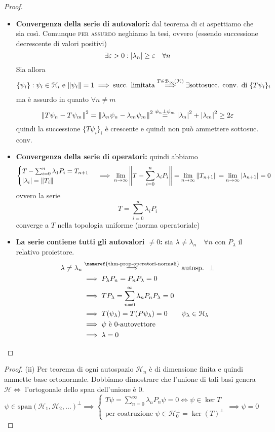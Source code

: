 \documentclass[a4paper,10pt]{article}
\theoremstyle{definition}
\newcommand{\hil}{\mathcal{H}} %
\newcommand{\noun}[1]{\textsc{#1}}
\theoremstyle{indentdefinition}
\theoremstyle{indenttheorem}
\theoremstyle{myremark}
\theoremstyle{indentgeneral}
\begin{document}
\begin{proof}
\begin{itemize}
    \item \textbf{Convergenza della serie di autovalori:} dal teorema di  ci aspettiamo che sia così. Comunque \noun{per assurdo} neghiamo la tesi, ovvero (essendo successione decrescente di valori positivi) 
    $$\exists\varepsilon>0:\abs{\lambda_n}\ge \varepsilon\quad 
    \forall n$$
    Sia allora
    \begin{align*}
        \{\psi_i\}: \psi_i\in\hil_i \text{ e } \norm{\psi_i}=1\implies \text{succ. limitata}\overset{T\in\mathcal{B}_\infty(\hil)}{\implies}\exists \text{sottosucc. conv. di } \{T\psi_i\}_i
    \end{align*}
    ma è assurdo in quanto $\forall n\ne m$
    $$\norm{T\psi_n-T\psi_m}^2=\norm{\lambda_n\psi_n-\lambda_m\psi_m}^2\overset{\psi_n\perp\psi_m}{=}\abs{\lambda_n}^2+\abs{\lambda_m}^2\ge 2\varepsilon$$
    quindi la successione $\{T\psi_i\}_i$ è crescente e quindi non può ammettere sottosuc. conv. \lightning
    \item \textbf{Convergenza della serie di operatori:} quindi abbiamo
    $$\begin{cases}
        T-\sum_{i=0}^n\lambda_1P_i=T_{n+1}\\
        \abs{\lambda_i}=\norm{T_i}
    \end{cases}\implies\lim_{n\to\infty}\norm{T-\sum_{i=0}^n\lambda_iP_i}=\lim_{n\to\infty}\norm{T_{n+1}}=\lim_{n\to\infty}\abs{\lambda_{n+1}}=0$$
    ovvero la serie
    $$T=\sum_{i=0}^\infty\lambda_iP_i$$
    converge a $T$ nella topologia uniforme (norma operatoriale)
    \item \textbf{La serie contiene tutti gli autovalori $\ne0$:} sia $\lambda\ne\lambda_n \quad \forall n$ con $P_\lambda$ il relativo proiettore.
\begin{align*}
\lambda\ne\lambda_n &\overset{\text{\nameref{thm-prop-operatori-normali}}}{\implies} \text{autosp. }\perp \\
&\implies P_\lambda P_n=P_nP_\lambda=0 \\
&\implies TP_\lambda=\sum_{n=0}^{\infty}\lambda_nP_nP_\lambda=0\\
&\implies T(\psi_\lambda)=T(P\psi_\lambda)=0 \qquad \psi_\lambda\in\hil_\lambda\\
&\implies \psi \text{ è 0-autovettore}\\
&\implies\lambda=0
\end{align*}
\end{itemize}
\end{proof}
\begin{proof} (ii) Per teorema di  ogni autospazio $\hil_n$ è di dimensione finita e quindi ammette base ortonormale. Dobbiamo dimostrare che l'unione di tali basi genera $\hil\iff$ l'ortogonale dello span dell'unione è 0.
$$\psi\in\text{span}(\hil_1,\hil_2,\dots)^\perp\implies\begin{cases}
    T\psi=\sum_{n=0}^\infty\lambda_nP_n\psi=0\iff \psi\in\ker T\\
    \text{per coatruzione } \psi\in\hil_0^\perp=\ker(T)^\perp
\end{cases}\implies\psi=0$$
    
\end{proof}
\end{document}
